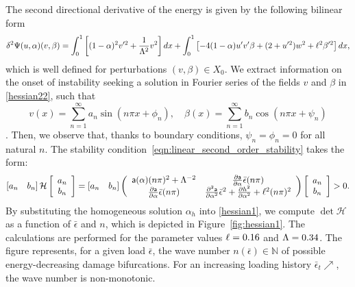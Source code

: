 {The second directional derivative of the energy is given by the following bilinear form}
\begin{equation}
\delta^2 \Psi(u,\alpha)(v,\beta)=\int_0^1 \left[(1-\alpha)^2v'^2 
+\frac{1}{\Lambda^2} v^2 \right]dx
+\int_0^1
\left[ - 4(1-\alpha)u' v'\beta+(2+ u'^2)w^2+\ell^2\beta'^2 \right] dx, 
\label{hessian22}
\end{equation}
which is well defined for perturbations $(v, \beta)\in X_0$.
{We} extract information on the onset of instability  seeking a solution in Fourier series of the fields $v$ and $\beta$ in \eqref{hessian22}, such that $$v(x)=\sum_{n=1}^{\infty} a_{n} \sin \left(n \pi x+\phi_{n}\right), \quad \beta(x)=\sum_{n=1}^{\infty} b_{n} \cos \left(n \pi x+\psi_{n}\right)$$. Then, we observe that, thanks to boundary conditions, $\psi_{n}=\phi_{n}=0$ for all natural $n$. The stability condition~\eqref{eqn:linear_second_order_stability}  takes the form:
\begin{align}\left[ a_n \quad b_n \right] \mathcal{H} \left[ \begin{array}{c} a_n \\ b_n \end{array} \right]=\left[ a_n \quad b_n \right]\left(
\begin{array}{cc}
\mathsf{a}(\alpha)(n\pi)^2+\Lambda^{-2}  & \frac{\partial \mathsf{a}}{\partial \alpha}\bar\epsilon(n\pi)  \\
\frac{\partial \mathsf{a}}{\partial \alpha}\bar\epsilon(n\pi)  &   \frac{\partial^2 \mathsf{a}}{\partial \alpha^2}\bar\epsilon^2+ \frac{\partial h^2}{\partial \alpha^2}+\ell^2(n\pi)^2  \\
\end{array}
\right)\left[ \begin{array}{c} a_n \\ b_n \end{array} \right]>0.\label{hessian1}\end{align}
% 
By substituting the homogeneous solution $\alpha_h$ into \eqref{hessian1}, we compute $\det \mathcal{H}$ as a function of $\bar \epsilon$ and $n$, which is depicted in Figure~\ref{fig:hessian1}. The calculations are performed for the parameter values $\ell=0.16$ and $\Lambda=0.34$.
The figure represents, for a given load $\bar \epsilon$, the wave number $n(\bar \epsilon)\in \mathbb N$ of possible energy-decreasing damage bifurcations. For an increasing loading history $\bar \epsilon_t\nearrow$, the wave number is non-monotonic.
